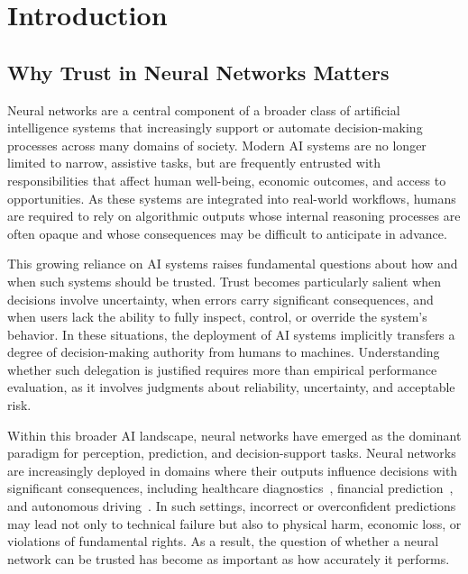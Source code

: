 
\chapter{Introduction} %
\label{chap:intro} %

\section{Why Trust in Neural Networks Matters}
\label{sec:motivation}
Neural networks are a central component of a broader class of artificial intelligence systems that increasingly support or automate decision-making processes across many domains of society. Modern AI systems are no longer limited to narrow, assistive tasks, but are frequently entrusted with responsibilities that affect human well-being, economic outcomes, and access to opportunities. As these systems are integrated into real-world workflows, humans are required to rely on algorithmic outputs whose internal reasoning processes are often opaque and whose consequences may be difficult to anticipate in advance.

This growing reliance on AI systems raises fundamental questions about how and when such systems should be trusted. Trust becomes particularly salient when decisions involve uncertainty, when errors carry significant consequences, and when users lack the ability to fully inspect, control, or override the system’s behavior. In these situations, the deployment of AI systems implicitly transfers a degree of decision-making authority from humans to machines. Understanding whether such delegation is justified requires more than empirical performance evaluation, as it involves judgments about reliability, uncertainty, and acceptable risk.

Within this broader AI landscape, neural networks have emerged as the dominant paradigm for perception, prediction, and decision-support tasks. Neural networks are increasingly deployed in domains where their outputs influence decisions with significant consequences, including healthcare diagnostics~\cite{Shahid2019-eq}, financial prediction~\cite{NBERw31502}, and autonomous driving~\cite{10604830}. In such settings, incorrect or overconfident predictions may lead not only to technical failure but also to physical harm, economic loss, or violations of fundamental rights. As a result, the question of whether a neural network can be trusted has become as important as how accurately it performs.

